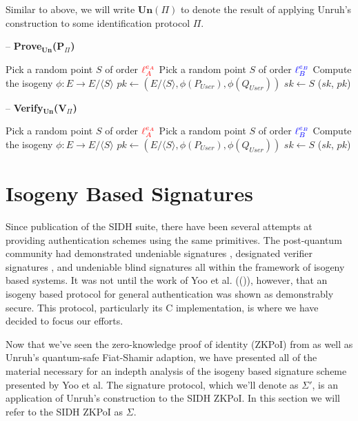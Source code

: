Similar to above, we will write $\textbf{Un}(\Pi)$ to denote the result of applying Unruh's construction to some identification protocol $\Pi$.

\begin{algorithm}
\caption{-- \textbf{Prove$_{\textbf{Un}}$(\textbf{P}$_{\Pi}$)}}\label{alg:unruhconst}
\begin{algorithmic}[1]
	\State Pick a random point $S$ of order $\textcolor{red}{\ell_{A}^{e_A}}$
\EndIf
{}
	\State Pick a random point $S$ of order $\textcolor{blue}{\ell_{B}^{e_B}}$
\EndIf
\State Compute the isogeny $\phi: E \rightarrow E/\langle S \rangle$
\State $pk \gets (E/\langle S \rangle, \phi(P_{User}), \phi(Q_{User}))$
\State $sk \gets S$
\State \Return ($sk$, $pk$)
\end{algorithmic}
\end{algorithm}

\begin{algorithm}
\caption{-- \textbf{Verify$_{\textbf{Un}}$(\textbf{V}$_{\Pi}$)}}\label{alg:unruhconst}
\begin{algorithmic}[1]
	\State Pick a random point $S$ of order $\textcolor{red}{\ell_{A}^{e_A}}$
\EndIf
{}
	\State Pick a random point $S$ of order $\textcolor{blue}{\ell_{B}^{e_B}}$
\EndIf
\State Compute the isogeny $\phi: E \rightarrow E/\langle S \rangle$
\State $pk \gets (E/\langle S \rangle, \phi(P_{User}), \phi(Q_{User}))$
\State $sk \gets S$
\State \Return ($sk$, $pk$)
\end{algorithmic}
\end{algorithm}

\section{Isogeny Based Signatures}
\label{sec:sigsbackground}

Since publication of the SIDH suite, there have been several attempts at providing authentication schemes using the same primitives. The post-quantum community had demonstrated undeniable signatures \cite{jvsig}, designated verifier signatures \cite{sunsig}, and undeniable blind signatures \cite{seshsig} all within the framework of isogeny based systems. It was not until the work of Yoo et al. ((\cite{yoo})), however, that an isogeny based protocol for general authentication was shown as demonstrably secure. This protocol, particularly its C implementation, is where we have decided to focus our efforts.

Now that we've seen the zero-knowledge proof of identity (ZKPoI) from \cite{djp} as well as Unruh's quantum-safe Fiat-Shamir adaption, we have presented all of the material necessary for an indepth analysis of the isogeny based signature scheme presented by Yoo et al. The signature protocol, which we'll denote as $\Sigma'$, is an application of Unruh's construction to the SIDH ZKPoI. In this section we will refer to the SIDH ZKPoI as $\Sigma$.

